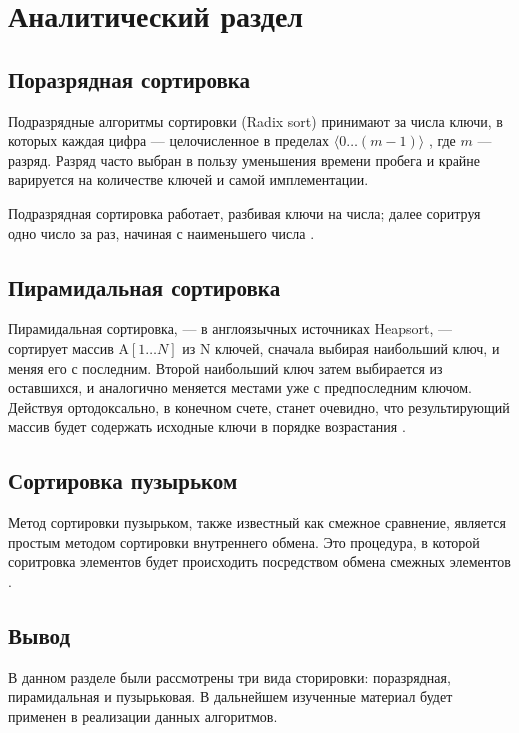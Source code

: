\chapter{Аналитический раздел}
\label{cha:analysis}
%
%

\section{Поразрядная сортировка}
Подразрядные алгоритмы сортировки (Radix sort) принимают за числа ключи, в которых каждая цифра --- целочисленное в пределах $\langle 0\dots(m - 1) \rangle$
, где $m$ --- разряд. Разряд часто выбран в пользу уменьшения времени пробега и крайне варируется на количестве ключей и самой имплементации.

Подразрядная сортировка работает, разбивая ключи на числа; далее соритруя одно число за раз, начиная с наименьшего числа \cite{zagha1991radix}.
\section{Пирамидальная сортировка}
Пирамидальная сортировка, --- в англоязычных источниках Heapsort, --- сортирует массив $\text{A} [1\dots N]$ из $\text{N}$ ключей, сначала выбирая наибольший ключ, и меняя его с последним. Второй наибольший ключ затем выбирается из оставшихся, и аналогично меняется местами уже с предпоследним ключом. Действуя ортодоксально, в конечном счете, станет очевидно, что результирующий массив будет содержать исходные ключи в порядке возрастания \cite{schaffer1993analysis}.
\section{Сортировка пузырьком}
Метод сортировки пузырьком, также известный как смежное сравнение, является простым методом сортировки внутреннего обмена. Это процедура, в которой соритровка элементов будет происходить посредством обмена смежных элементов \cite{min2010analysis}. 

\section{Вывод}
В данном разделе были рассмотрены три вида сторировки: поразрядная, пирамидальная и пузырьковая. В дальнейшем изученные материал будет применен в реализации данных алгоритмов.

